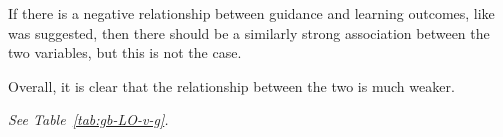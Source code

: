 If there is a negative relationship between guidance and learning outcomes, like was suggested, then there should be a similarly strong association between the two variables, but this is not the case. %







Overall, it is clear that the relationship between the two is much weaker. %







\emph{See Table~\ref{tab:gb-LO-v-g}.} 















